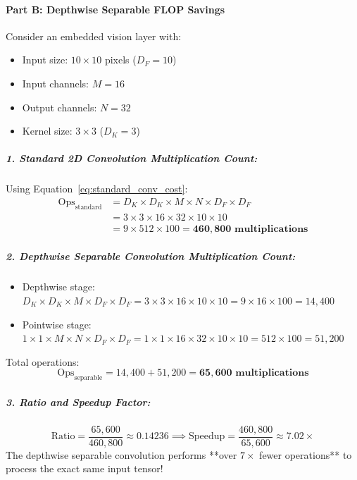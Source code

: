 \begin{example}
\paragraph{Part B: Depthwise Separable FLOP Savings}
Consider an embedded vision layer with:
\begin{itemize}
    \item Input size: $10 \times 10$ pixels ($D_F = 10$)
    \item Input channels: $M = 16$
    \item Output channels: $N = 32$
    \item Kernel size: $3 \times 3$ ($D_K = 3$)
\end{itemize}

\subparagraph{1. Standard 2D Convolution Multiplication Count:}
Using Equation~\eqref{eq:standard_conv_cost}:
\begin{align*}
\text{Ops}_{\text{standard}} &= D_K \times D_K \times M \times N \times D_F \times D_F\\
&= 3 \times 3 \times 16 \times 32 \times 10 \times 10\\
&= 9 \times 512 \times 100 = \mathbf{460{,}800 \text{ multiplications}}
\end{align*}

\subparagraph{2. Depthwise Separable Convolution Multiplication Count:}
\begin{itemize}
    \item Depthwise stage: $D_K \times D_K \times M \times D_F \times D_F = 3 \times 3 \times 16 \times 10 \times 10 = 9 \times 16 \times 100 = 14{,}400$
    \item Pointwise stage: $1 \times 1 \times M \times N \times D_F \times D_F = 1 \times 1 \times 16 \times 32 \times 10 \times 10 = 512 \times 100 = 51{,}200$
\end{itemize}
Total operations:
\begin{equation*}
\text{Ops}_{\text{separable}} = 14{,}400 + 51{,}200 = \mathbf{65{,}600 \text{ multiplications}}
\end{equation*}

\subparagraph{3. Ratio and Speedup Factor:}
\begin{equation*}
\text{Ratio} = \frac{65{,}600}{460{,}800} \approx \mathbf{0.14236} \implies \text{Speedup} = \frac{460{,}800}{65{,}600} \approx \mathbf{7.02\times}
\end{equation*}
The depthwise separable convolution performs **over $7\times$ fewer operations** to process the exact same input tensor!
\end{example}

